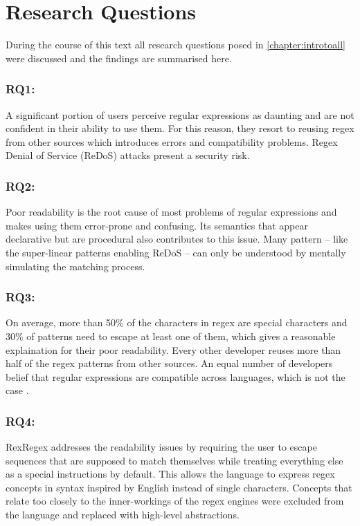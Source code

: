 \section{Research Questions}

During the course of this text all research questions posed in \ref{chapter:introtoall} were discussed and the findings are summarised here.

\subsubsection{RQ1: \RQone}

A significant portion of users perceive regular expressions as daunting and are not confident in their ability to use them. For this reason, they resort to reusing regex from other sources which introduces errors and compatibility problems. Regex Denial of Service (ReDoS) attacks present a security risk.

\subsubsection{RQ2: \RQtwo}

Poor readability is the root cause of most problems of regular expressions and makes using them error-prone and confusing. Its semantics that appear declarative but are procedural also contributes to this issue. Many pattern -- like the super-linear patterns enabling ReDoS -- can only be understood by mentally simulating the matching process. 

\subsubsection{RQ3: \RQthree}

On average, more than 50\% of the characters in regex are special characters and 30\% of patterns need to escape at least one of them, which gives a reasonable explaination for their poor readability. Every other developer reuses more than half of the regex patterns from other sources. An equal number of developers belief that regular expressions are compatible across languages, which is not the case \cite{RegexNotLinguaFranca}.

\subsubsection{RQ4: \RQfour}

RexRegex addresses the readability issues by requiring the user to escape sequences that are supposed to match themselves while treating everything else as a special instructions by default. This allows the language to express regex concepts in syntax inspired by English instead of single characters. Concepts that relate too closely to the inner-workings of the regex engines were excluded from the language and replaced with high-level abstractions.

